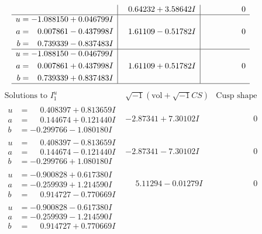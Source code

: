 \documentclass[1p]{elsarticle_modified}
\theoremstyle{definition}
\newcommand{\I}{\sqrt{-1}}
\begin{document}
$$\begin{array}{c|c|c}
 & \phantom{-}0.64232 + 3.58642 I & \phantom{-0.000000 } 0 \\ \hline\begin{aligned}
u &= -1.088150 + 0.046799 I \\
a &= \phantom{-}0.007861 - 0.437998 I \\
b &= \phantom{-}0.739339 - 0.837483 I\end{aligned}
 & \phantom{-}1.61109 - 0.51782 I & \phantom{-0.000000 } 0 \\ \hline\begin{aligned}
u &= -1.088150 - 0.046799 I \\
a &= \phantom{-}0.007861 + 0.437998 I \\
b &= \phantom{-}0.739339 + 0.837483 I\end{aligned}
 & \phantom{-}1.61109 + 0.51782 I & \phantom{-0.000000 } 0\\
 \hline 
 \end{array}$$\newpage$$\begin{array}{c|c|c}  
\text{Solutions to }I^u_{1}& \I (\text{vol} + \sqrt{-1}CS) & \text{Cusp shape}\\
 \hline 
\begin{aligned}
u &= \phantom{-}0.408397 + 0.813659 I \\
a &= \phantom{-}0.144674 + 0.121440 I \\
b &= -0.299766 - 1.080180 I\end{aligned}
 & -2.87341 + 7.30102 I & \phantom{-0.000000 } 0 \\ \hline\begin{aligned}
u &= \phantom{-}0.408397 - 0.813659 I \\
a &= \phantom{-}0.144674 - 0.121440 I \\
b &= -0.299766 + 1.080180 I\end{aligned}
 & -2.87341 - 7.30102 I & \phantom{-0.000000 } 0 \\ \hline\begin{aligned}
u &= -0.900828 + 0.617380 I \\
a &= -0.259939 + 1.214590 I \\
b &= \phantom{-}0.914727 - 0.770669 I\end{aligned}
 & \phantom{-}5.11294 - 0.01279 I & \phantom{-0.000000 } 0 \\ \hline\begin{aligned}
u &= -0.900828 - 0.617380 I \\
a &= -0.259939 - 1.214590 I \\
b &= \phantom{-}0.914727 + 0.770669 I\end{aligned}

\end{array}$$
\end{document}
